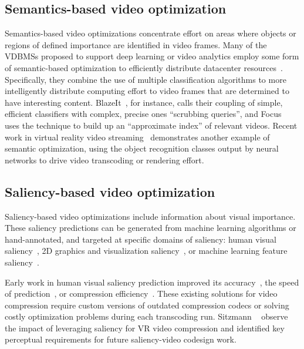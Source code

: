\subsection{Semantics-based video optimization}
Semantics-based video optimizations concentrate effort on areas where objects or regions of defined importance are identified in video frames.
Many of the VDBMSs proposed to support deep learning or video analytics employ some form of semantic-based optimization to efficiently distribute datacenter resources~\cite{videostorm, chameleon18sigcomm, focus18osdi, blazeit, noscope}.
Specifically, they combine the use of multiple classification algorithms to more intelligently distribute computing effort to video frames that are determined to have interesting content.
BlazeIt~\cite{blazeit}, for instance, calls their coupling of simple, efficient classifiers with complex, precise ones ``scrubbing queries'', and Focus~\cite{focus18osdi} uses the technique to build up an ``approximate index'' of relevant videos.
Recent work in virtual reality video streaming~\cite{leng2018semantic,leng2019vrv} demonstrates another example of semantic optimization, using the object recognition classes output by neural networks to drive video transcoding or rendering effort.

\subsection{Saliency-based video optimization}
Saliency-based video optimizations include information about visual importance.
These saliency predictions can be generated from machine learning algorithms or hand-annotated, and targeted at specific domains of saliency: human visual saliency~\cite{lee2012perceptualcodingsurvey}, 2D graphics and visualization saliency~\cite{borkin2013makes,Bylinskii:2017:LVI:3126594.3126653}, or machine learning feature saliency~\cite{olah2018the,Simonyan2013DeepIC,Zeiler2014VisualizingAU,Zintgraf2017VisualizingDN}.

Early work in human visual saliency prediction improved its accuracy~\cite{li2011visual, lee2012perceptualcodingsurvey}, the speed of prediction~\cite{GUPTA20131006, zund2013content, 5223506}, or compression efficiency~\cite{zund2013content, 8117038, 5223506,hadizadeh2014vidcomp,sitzmann2018saliency}.
These existing solutions for video compression require custom versions of outdated compression codecs or solving costly optimization problems during each transcoding run.
Sitzmann \etal~\cite{sitzmann2018saliency} observe the impact of leveraging saliency for VR video compression and identified key perceptual requirements for future saliency-video codesign work.

